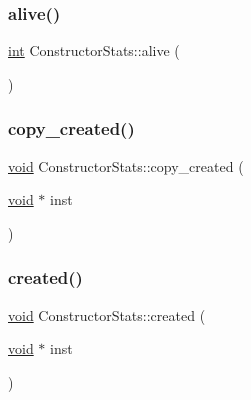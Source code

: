 \subsubsection{\texorpdfstring{alive()}{alive()}}
{\footnotesize\ttfamily \mbox{\hyperlink{warnings_8h_a74f207b5aa4ba51c3a2ad59b219a423b}{int}} Constructor\+Stats\+::alive (\begin{DoxyParamCaption}{ }\end{DoxyParamCaption})\hspace{0.3cm}{\ttfamily [inline]}}

\mbox{\label{class_constructor_stats_a472049c1c5981e89eed755dd8ec14e9a}} 
\subsubsection{\texorpdfstring{copy\_created()}{copy\_created()}}
{\footnotesize\ttfamily \mbox{\hyperlink{_s_d_l__opengles2__gl2ext_8h_ae5d8fa23ad07c48bb609509eae494c95}{void}} Constructor\+Stats\+::copy\+\_\+created (\begin{DoxyParamCaption}\item[{\mbox{\hyperlink{_s_d_l__opengles2__gl2ext_8h_ae5d8fa23ad07c48bb609509eae494c95}{void}} $\ast$}]{inst }\end{DoxyParamCaption})\hspace{0.3cm}{\ttfamily [inline]}}

\mbox{\label{class_constructor_stats_a72854cee1d7cb0b02c27dc88d81a8621}} 
\subsubsection{\texorpdfstring{created()}{created()}}
{\footnotesize\ttfamily \mbox{\hyperlink{_s_d_l__opengles2__gl2ext_8h_ae5d8fa23ad07c48bb609509eae494c95}{void}} Constructor\+Stats\+::created (\begin{DoxyParamCaption}\item[{\mbox{\hyperlink{_s_d_l__opengles2__gl2ext_8h_ae5d8fa23ad07c48bb609509eae494c95}{void}} $\ast$}]{inst }\end{DoxyParamCaption})\hspace{0.3cm}{\ttfamily [inline]}}

